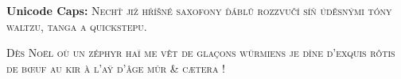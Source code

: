 \documentclass{scrartcl}
\begin{document}
\noindent\textbf{Unicode Caps:}
\textsc{Nechť již hříšné saxofony ďáblů rozzvučí síň úděsnými tóny waltzu, tanga a quickstepu.}

\textsc{Dès Noël où un zéphyr haï me vêt de glaçons würmiens je dîne d’exquis rôtis de bœuf au kir à l’aÿ d’âge mûr \& cætera !}
\end{document}
